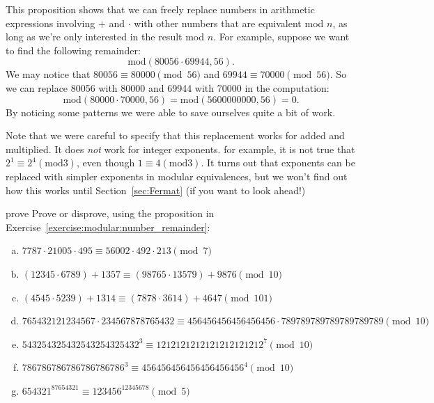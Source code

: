 This proposition shows that we can freely replace  numbers  in arithmetic expressions involving $+$ and $\cdot$ with other numbers that are equivalent mod $n$,  as long as we're only interested in the result mod $n$. For example, suppose we  want to find the following remainder:  
\[
\text{mod}(80056 \cdot 69944, 56).  
\]
We may notice that $80056 \equiv 80000 \pmod{56}$ and $69944 \equiv 70000 \pmod{56}$.  So we can replace 80056 with 80000 and 69944 with 70000 in the computation:
\[
  \text{mod}(80000 \cdot 70000, 56)= \text{mod}(5600000000, 56)=0.
\]
By noticing some patterns we were able to save ourselves quite a bit of work.

Note that we were careful to specify that this replacement works for added and multiplied. It does \emph{not} work for integer exponents. for example, it is not true that $2^1 \equiv 2^4 (\text{mod} 3)$, even though $1 \equiv 4  (\text{mod} 3)$. It turns out that exponents can be replaced with simpler exponents in modular equivalences, but we won't find out how this works until  Section~\ref{sec:Fermat} (if you want to look ahead!) 
  
\begin{exercise}{prove}
Prove or disprove, using the proposition in Exercise~\ref{exercise:modular:number_remainder}:
\begin{enumerate}[(a)]
\item
$7787 \cdot 21005 \cdot 495 \equiv 56002 \cdot  492 \cdot 213 \pmod{7}$
\item
$(12345 \cdot 6789) + 1357 \equiv (98765 \cdot 13579) + 9876 \pmod{10}$
\item
$(4545 \cdot 5239) + 1314 \equiv (7878 \cdot 3614) + 4647 \pmod{101}$
\item
$765432121234567\cdot 234567878765432 \equiv 456456456456456456 \cdot 789789789789789789789 \pmod{10}$
\item
$543254325432543254325432^3 \equiv 1212121212121212121212^7  \pmod{10}$
\item
$786786786786786786786^3 \equiv 456456456456456456456^4  \pmod{10}$
\item
$654321^{87654321} \equiv 123456^{12345678}  \pmod{5}$
\end{enumerate}
\end{exercise}


